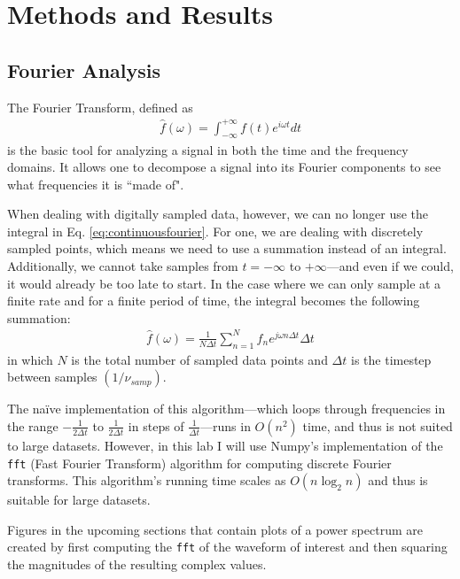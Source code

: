 \documentclass[12pt]{article}
\begin{document}
\section{Methods and Results}

\subsection{Fourier Analysis}
The Fourier Transform, defined as
\begin{eqnarray}
\hat{f}(\omega) = \int_{-\infty}^{+\infty}f(t)e^{i\omega t} dt \label{eq:continuousfourier}
\end{eqnarray}
is the basic tool for analyzing a signal in both the time and the frequency domains. It allows one to decompose a signal into its Fourier components to see what frequencies it is ``made of".

When dealing with digitally sampled data, however, we can no longer use the integral in Eq. \ref{eq:continuousfourier}. For one, we are dealing with discretely sampled points, which means we need to use a summation instead of an integral. Additionally, we cannot take samples from $t=-\infty$ to $+\infty$---and even if we could, it would already be too late to start. In the case where we can only sample at a finite rate and for a finite period of time, the integral becomes the following summation:
\begin{eqnarray}
\hat{f}(\omega) = \frac{1}{N\Delta{t}}\sum_{n=1}^{N} f_n e^{j\omega n \Delta{t}} \Delta{t}
\end{eqnarray}
in which $N$ is the total number of sampled data points and $\Delta{t}$ is the timestep between samples $\left( 1/\nu_{samp} \right)$.

The na\"{i}ve implementation of this algorithm---which loops through frequencies in the range $-\frac{1}{2\Delta{t}}$ to $\frac{1}{2\Delta{t}}$ in steps of $\frac{1}{\Delta{t}}$---runs in $O\left(n^2\right)$ time, and thus is not suited to large datasets. However, in this lab I will use Numpy's implementation of the \texttt{fft} (Fast Fourier Transform) algorithm for computing discrete Fourier transforms. This algorithm's running time scales as $O\left( n \log_2 n \right)$ and thus is suitable for large datasets.

Figures in the upcoming sections that contain plots of a power spectrum are created by first computing the \texttt{fft} of the waveform of interest and then squaring the magnitudes of the resulting complex values.
\end{document}
